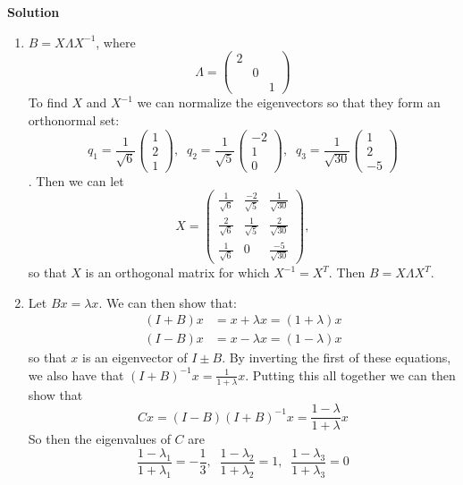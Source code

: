 \documentclass[11pt]{article}
\begin{document}
\noindent \textbf{Solution}\\
\begin{enumerate}
\item $B = X\Lambda X^{-1}$, where 
$$\boxed{\Lambda = \begin{pmatrix} 2 & & \\ & 0 & \\ & & 1 \end{pmatrix}}$$
To find $X$ and $X^{-1}$ we can normalize the eigenvectors so that they form an orthonormal set:
$$q_1 = \frac{1}{\sqrt{6}}\begin{pmatrix} 1 \\ 2 \\ 1 \end{pmatrix}, \;\; q_2 = \frac{1}{\sqrt{5}}\begin{pmatrix} -2 \\ 1 \\ 0 \end{pmatrix}, \;\; q_3 = \frac{1}{\sqrt{30}} \begin{pmatrix} 1 \\ 2 \\ -5 \end{pmatrix}$$.
Then we can let 
$$X = \begin{pmatrix} \frac{1}{\sqrt{6}} & \frac{-2}{\sqrt{5}} & \frac{1}{\sqrt{30}} \\  \frac{2}{\sqrt{6}} & \frac{1}{\sqrt{5}} & \frac{2}{\sqrt{30}} \\  \frac{1}{\sqrt{6}} &0 & \frac{-5}{\sqrt{30}} \end{pmatrix},$$
so that $X$ is an orthogonal matrix for which $X^{-1} = X^T$. Then $B=X\Lambda X^T$. 
\item Let $Bx = \lambda x$. We can then show that:
\begin{align}
(I+B)x &= x+\lambda x = (1+\lambda) x\\
(I-B)x &= x - \lambda x = (1-\lambda) x
\end{align}
so that $x$ is an eigenvector of $I\pm B$. By inverting the first of these equations, we also have that $(I+B)^{-1} x = \frac{1}{1+\lambda} x$. Putting this all together we can then show that
$$Cx = (I-B)(I+B)^{-1} x = \frac{1-\lambda}{1+\lambda} x$$
So then the eigenvalues of $C$ are
$$ \frac{1-\lambda_1}{1+\lambda_1} = -\frac{1}{3}, \;\; \frac{1-\lambda_2}{1+\lambda_2} =1, \;\; \frac{1-\lambda_3}{1+\lambda_3} = 0$$
\end{enumerate}

\
\end{document}

